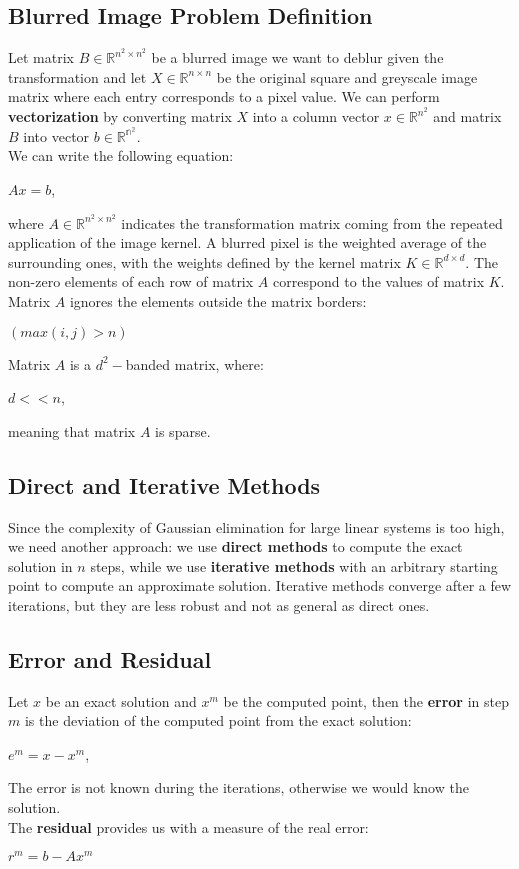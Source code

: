 \documentclass{article}
\begin{document}
\subsection{Blurred Image Problem Definition}
Let matrix $B \in \mathbb{R}^{n^2 \times n^2}$ be a blurred image we want to deblur given the transformation and let $X \in \mathbb{R}^{n \times n}$ be the original square and greyscale image matrix where each entry corresponds to a pixel value. We can perform \textbf{vectorization} by converting matrix $X$ into a column vector $x \in \mathbb{R}^{n^2}$ and matrix $B$ into vector $b \in \mathbb{R^{n^2}}$. \\
We can write the following equation:
\begin{center}
    $Ax = b$,
\end{center}
where $A \in \mathbb{R}^{n^2 \times n^2}$ indicates the transformation matrix coming from the repeated application of the image kernel. A blurred pixel is the weighted average of the surrounding ones, with the weights defined by the kernel matrix $K \in \mathbb{R}^{d\times d}$. The non-zero elements of each row of matrix $A$ correspond to the values of matrix $K$.
Matrix $A$ ignores the elements outside the matrix borders:
\begin{center}
    $(max(i, j) > n)$
\end{center}
Matrix $A$ is a $d^2-$banded matrix, where:
\begin{center}
    $d << n$,
\end{center}
meaning that matrix $A$ is sparse.
\subsection{Direct and Iterative Methods}
Since the complexity of Gaussian elimination for large linear systems is too high, we need another approach: we use \textbf{direct methods} to compute the exact solution in $n$ steps, while we use \textbf{iterative methods} with an arbitrary starting point to compute an approximate solution. Iterative methods converge after a few iterations, but they are less robust and not as general as direct ones.
\subsection{Error and Residual}
Let $x$ be an exact solution and $x^m$ be the computed point, then the \textbf{error} in step $m$ is the deviation of the computed point from the exact solution:
\begin{center}
    $e^{m} = x - x^m$,
\end{center}
The error is not known during the iterations, otherwise we would know the solution. \\
The \textbf{residual} provides us with a measure of the real error:
\begin{center}
    $r^m = b - Ax^m$
\end{center}
\newpage
\end{document}
